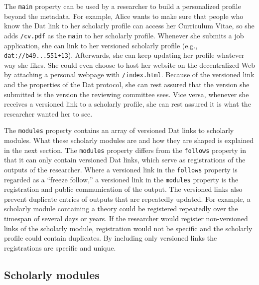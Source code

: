 \documentclass[publications,article,submit,moreauthors,pdftex,10pt,a4paper]{Definitions/mdpi}
\begin{document}
The \texttt{main} property can be used by a researcher to build a
personalized profile beyond the metadata. For example, Alice wants to
make sure that people who know the Dat link to her scholarly profile can
access her Curriculum Vitae, so she adds \texttt{/cv.pdf} as the
\texttt{main} to her scholarly profile. Whenever she submits a job
application, she can link to her versioned scholarly profile (e.g.,
\texttt{dat://b49...551+13}). Afterwards, she can keep updating her
profile whatever way she likes. She could even choose to host her
website on the decentralized Web by attaching a personal webpage with
\texttt{/index.html}. Because of the versioned link and the properties
of the Dat protocol, she can rest assured that the version she submitted
is the version the reviewing committee sees. Vice versa, whenever she
receives a versioned link to a scholarly profile, she can rest assured
it is what the researcher wanted her to see.

The \texttt{modules} property contains an array of versioned Dat links
to scholarly modules. What these scholarly modules are and how they are
shaped is explained in the next section. The \texttt{modules} property
differs from the \texttt{follows} property in that it can only contain
versioned Dat links, which serve as registrations of the outputs of the
researcher. Where a versioned link in the \texttt{follows} property is
regarded as a ``freeze follow,'' a versioned link in the
\texttt{modules} property is the registration and public communication
of the output. The versioned links also prevent duplicate entries of
outputs that are repeatedly updated. For example, a scholarly module
containing a theory could be registered repeatedly over the timespan of
several days or years. If the researcher would register non-versioned
links of the scholarly module, registration would not be specific and
the scholarly profile could contain duplicates. By including only
versioned links the registrations are specific and unique.

\subsection*{Scholarly modules}\label{scholarly-modules}
\end{document}
